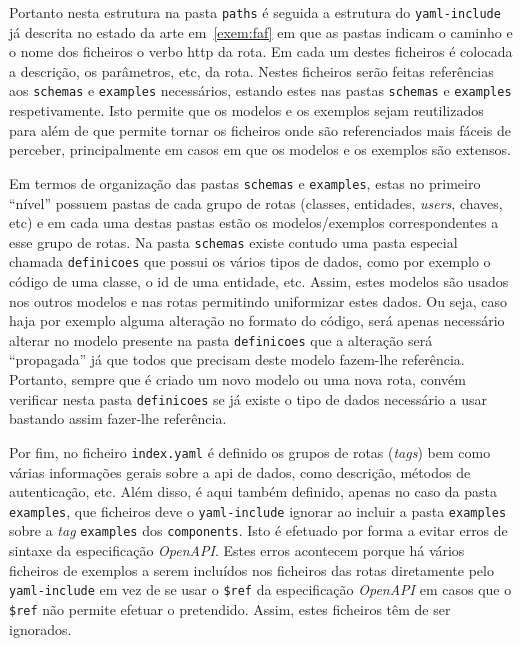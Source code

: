 Portanto nesta estrutura na pasta \texttt{paths} é seguida a estrutura do \texttt{yaml-include} já descrita no estado da arte em~\ref{exem:faf} em que as pastas indicam o caminho e o nome dos ficheiros o verbo \acrshort{http} da rota. Em cada um destes ficheiros é colocada a descrição, os parâmetros, etc, da rota. Nestes ficheiros serão feitas referências aos \texttt{schemas} e \texttt{examples} necessários, estando estes nas pastas \texttt{schemas} e \texttt{examples} respetivamente. Isto permite que os modelos e os exemplos sejam reutilizados para além de que permite tornar os ficheiros onde são referenciados mais fáceis de perceber, principalmente em casos em que os modelos e os exemplos são extensos.

Em termos de organização das pastas \texttt{schemas} e \texttt{examples}, estas no primeiro ``nível'' possuem pastas de cada grupo de rotas (classes, entidades, \textit{users}, chaves, etc) e em cada uma destas pastas estão os modelos/exemplos correspondentes a esse grupo de rotas. Na pasta \texttt{schemas} existe contudo uma pasta especial chamada \texttt{definicoes} que possui os vários tipos de dados, como por exemplo o código de uma classe, o id de uma entidade, etc. Assim, estes modelos são usados nos outros modelos e nas rotas permitindo uniformizar estes dados. Ou seja, caso haja por exemplo alguma alteração no formato do código, será apenas necessário alterar no modelo presente na pasta \texttt{definicoes} que a alteração será ``propagada'' já que todos que precisam deste modelo fazem-lhe referência. Portanto, sempre que é criado um novo modelo ou uma nova rota, convém verificar nesta pasta \texttt{definicoes} se já existe o tipo de dados necessário a usar bastando assim fazer-lhe referência.

Por fim, no ficheiro \texttt{index.yaml} é definido os grupos de rotas (\textit{tags}) bem como várias informações gerais sobre a \acrshort{api} de dados, como descrição, métodos de autenticação, etc. Além disso, é aqui também definido, apenas no caso da pasta \texttt{examples}, que ficheiros deve o \texttt{yaml-include} ignorar ao incluir a pasta \texttt{examples} sobre a \textit{tag} \texttt{examples} dos \texttt{components}. Isto é efetuado por forma a evitar erros de sintaxe da especificação \textit{OpenAPI}. Estes erros acontecem porque há vários ficheiros de exemplos a serem incluídos nos ficheiros das rotas diretamente pelo \texttt{yaml-include} em vez de se usar o \verb|$ref| da especificação \textit{OpenAPI} em casos que o \verb|$ref| não permite efetuar o pretendido. Assim, estes ficheiros têm de ser ignorados.


